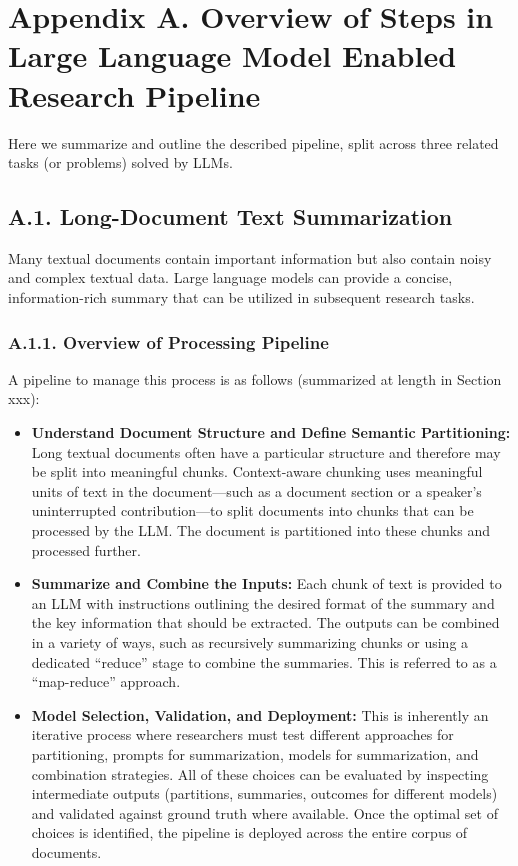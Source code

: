 \documentclass[11pt]{article}
\begin{document}
\vspace{1.5em}

\section*{Appendix A. Overview of Steps in Large Language Model Enabled Research Pipeline}

Here we summarize and outline the described pipeline, split across three related tasks (or problems) solved by LLMs.

\subsection*{A.1. Long-Document Text Summarization}

Many textual documents contain important information but also contain noisy and complex textual data. Large language models can provide a concise, information-rich summary that can be utilized in subsequent research tasks.

\subsubsection*{A.1.1. Overview of Processing Pipeline}

A pipeline to manage this process is as follows (summarized at length in Section xxx):

\begin{itemize}
    \item \textbf{Understand Document Structure and Define Semantic Partitioning:} Long textual documents often have a particular structure and therefore may be split into meaningful chunks. Context-aware chunking uses meaningful units of text in the document---such as a document section or a speaker's uninterrupted contribution---to split documents into chunks that can be processed by the LLM. The document is partitioned into these chunks and processed further.
    \item \textbf{Summarize and Combine the Inputs:} Each chunk of text is provided to an LLM with instructions outlining the desired format of the summary and the key information that should be extracted. The outputs can be combined in a variety of ways, such as recursively summarizing chunks or using a dedicated ``reduce'' stage to combine the summaries. This is referred to as a ``map-reduce'' approach.
    \item \textbf{Model Selection, Validation, and Deployment:} This is inherently an iterative process where researchers must test different approaches for partitioning, prompts for summarization, models for summarization, and combination strategies. All of these choices can be evaluated by inspecting intermediate outputs (partitions, summaries, outcomes for different models) and validated against ground truth where available. Once the optimal set of choices is identified, the pipeline is deployed across the entire corpus of documents.
\end{itemize}
\end{document}
